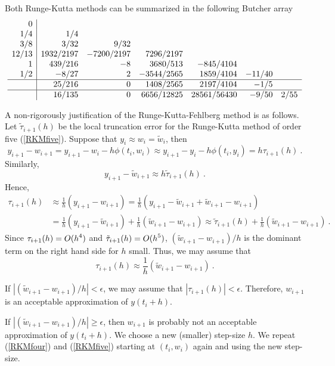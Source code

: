 Both Runge-Kutta methods can be summarized in the following Butcher
array
\[
\begin{array}{r|rrrrrr}
0 & & & & & & \\
1/4 & 1/4 & & & & & \\
3/8 & 3/32 & 9/32 & & & & \\
12/13 & 1932/2197 &
-7200/2197 & 7296/2197 & & & \\
1 & 439/216 & -8 & 3680/513 & -845/4104 & & \\
1/2 & -8/27 & 2 & -3544/2565 & 1859/4104 & -11/40 & \\
\hline
 & 25/216 & 0 & 1408/2565 & 2197/4104 & -1/5 & \\
\hline
 & 16/135 & 0 & 6656/12825 & 28561/56430 & -9/50 & 2/55
\end{array}
\]

\begin{rmk}
A non-rigorously justification of the Runge-Kutta-Fehlberg method is
as follows.  Let $\tilde{\tau}_{i+1}(h)$ be the local truncation error
for the Runge-Kutta method of order five (\ref{RKMfive}).  Suppose
that $y_i \approx w_i = \tilde{w}_i$, then
\[
y_{i+1} - w_{i+1} = y_{i+1} - w_i -h \phi(t_i,w_i)
\approx y_{i+1} - y_i - h \phi(t_i,y_i) = h \tau_{i+1}(h) \ .
\]
Similarly,
\[
y_{i+1} - \tilde{w}_{i+1} \approx h \tilde{\tau}_{i+1}(h) \ .
\]
Hence,
\begin{align*}
\tau_{i+1}(h) &\approx \frac{1}{h} \left(y_{i+1} - w_{i+1} \right)
= \frac{1}{h}\left(y_{i+1} - \tilde{w}_{i+1} + \tilde{w}_{i+1} -
 w_{i+1} \right) \\
&= \frac{1}{h}\left(y_{i+1} - \tilde{w}_{i+1}\right) +
 \frac{1}{h}\left( \tilde{w}_{i+1} - w_{i+1} \right)
\approx \tilde{\tau}_{i+1}(h) +
 \frac{1}{h}\left( \tilde{w}_{i+1} -w_{i+1} \right) \ .
\end{align*}
Since $\displaystyle \tau_{i+1}(h) = O(h^4)$ and
$\displaystyle \tilde{\tau}_{i+1}(h) = O(h^5)$,
$(\tilde{w}_{i+1} - w_{i+1})/h$ is the dominant term on the right hand
side for $h$ small.  Thus, we may assume that
\begin{equation} \label{approx_tau}
\tau_{i+1}(h) \approx \frac{1}{h}\left( \tilde{w}_{i+1} - w_{i+1}
\right) \ .
\end{equation}

If $\left|(\tilde{w}_{i+1} - w_{i+1})/h\right| < \epsilon$, we may
assume that $|\tau_{i+1}(h)| < \epsilon$.  Therefore, $w_{i+1}$ is an
acceptable approximation of $y(t_i+h)$.

If $\left|(\tilde{w}_{i+1} - w_{i+1})/h\right| \geq \epsilon$, then
$w_{i+1}$ is probably not an acceptable approximation of $y(t_i+h)$.
We choose a new (smaller) step-size $h$.  We repeat (\ref{RKMfour}) and
(\ref{RKMfive}) starting at $(t_i,w_i)$ again and using the new
step-size.


\end{rmk}
